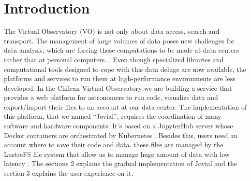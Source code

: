 \documentclass[11pt,twoside]{article}
\begin{document}
\section{Introduction} 
The Virtual Observatory (VO) is not only about data access, search and transport. The management of large volumes of data poses new challenges for data analysis, which are forcing these computations to be made at data centers rather that at personal computers. \citep{djorgovski2003challenges}.
Even though specialized libraries and computational tools designed to cope with this data deluge are now available, the platforms and services to run them at high-performance environments are less developed.
In the Chilean Virtual Observatory \citep{solar2015chilean} we are building a service that provides a web platform for astronomers to run code, visualize data and export/import their files to an account at our data center.
The implementation of this platform, that we named ``Jovial'', requires the coordination of many software and hardware components. It's based on a JupyterHub server \citep{jupyter2016github} whose Docker containers are orchestrated by Kubernetes \citep{bernstein2014containers}.
Besides this, users need an account where to save their code and data. these files are managed by the LustreFS file system that allow us to manage huge amount of data with low latency \citep{braam2002lustre}.
The sections 2 explains the gradual implementation of Jovial and the section 3 explains the user experience on it.
\end{document}
